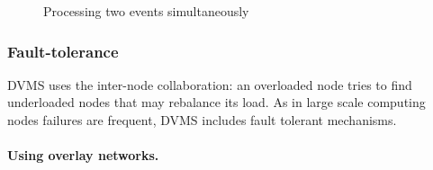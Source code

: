 \begin{figure}[h]
%
%
%
%
\caption{Processing two events simultaneously\label{fig:dvms_pte}}
\end{figure}


\subsubsection{Fault-tolerance}

DVMS uses the inter-node collaboration: an overloaded node tries to find 
underloaded nodes that may rebalance its load. As in large scale computing
nodes failures are frequent, DVMS includes fault tolerant mechanisms.



\paragraph{Using overlay networks.}


